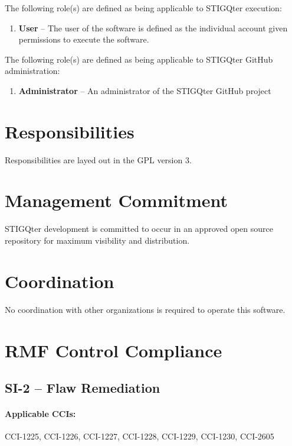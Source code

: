 \documentclass[letterpaper, 10pt, twoside]{article}
\begin{document}
The following role(s) are defined as being applicable to STIGQter execution:
\begin{enumerate}
	\item \textbf{User} -- The user of the software is defined as the individual account given permissions to execute the software.
\end{enumerate}

The following role(s) are defined as being applicable to STIGQter GitHub administration:
\begin{enumerate}
	\item \textbf{Administrator} -- An administrator of the STIGQter GitHub project
\end{enumerate}

\section{Responsibilities}
\label{sec:responsibilities}

Responsibilities are layed out in the GPL version 3.

\section{Management Commitment}

STIGQter development is committed to occur in an approved open source repository for maximum visibility and distribution.

\section{Coordination}

No coordination with other organizations is required to operate this software.

\section{RMF Control Compliance}

\subsection{SI-2 -- Flaw Remediation}

\paragraph{Applicable CCIs:} CCI-1225, CCI-1226, CCI-1227, CCI-1228, CCI-1229, CCI-1230, CCI-2605
\end{document}
